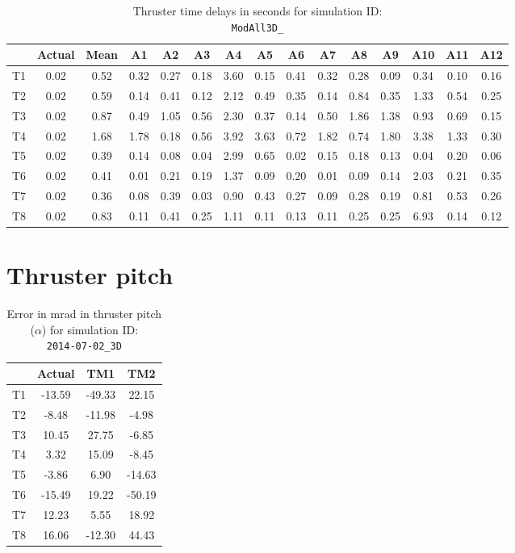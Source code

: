 \begin{table}[H]
\centering
\cprotect\caption{Thruster time delays in seconds for simulation ID:\\
\verb|ModAll3D_|}
\begin{tabular}{|c|c|c|c|c|c|c|c|c|c|c|c|c|c|c|} \hline
~ & Actual & Mean & A1 & A2 & A3 & A4 & A5 & A6 & A7 & A8 & A9 & A10 & A11 & A12 \\ \hline
T1 & 0.02 & 0.52 & 0.32 & 0.27 & 0.18 & 3.60 & 0.15 & 0.41 & 0.32 & 0.28 & 0.09 & 0.34 & 0.10 & 0.16 \\
T2 & 0.02 & 0.59 & 0.14 & 0.41 & 0.12 & 2.12 & 0.49 & 0.35 & 0.14 & 0.84 & 0.35 & 1.33 & 0.54 & 0.25 \\
T3 & 0.02 & 0.87 & 0.49 & 1.05 & 0.56 & 2.30 & 0.37 & 0.14 & 0.50 & 1.86 & 1.38 & 0.93 & 0.69 & 0.15 \\
T4 & 0.02 & 1.68 & 1.78 & 0.18 & 0.56 & 3.92 & 3.63 & 0.72 & 1.82 & 0.74 & 1.80 & 3.38 & 1.33 & 0.30 \\
T5 & 0.02 & 0.39 & 0.14 & 0.08 & 0.04 & 2.99 & 0.65 & 0.02 & 0.15 & 0.18 & 0.13 & 0.04 & 0.20 & 0.06 \\
T6 & 0.02 & 0.41 & 0.01 & 0.21 & 0.19 & 1.37 & 0.09 & 0.20 & 0.01 & 0.09 & 0.14 & 2.03 & 0.21 & 0.35 \\
T7 & 0.02 & 0.36 & 0.08 & 0.39 & 0.03 & 0.90 & 0.43 & 0.27 & 0.09 & 0.28 & 0.19 & 0.81 & 0.53 & 0.26 \\
T8 & 0.02 & 0.83 & 0.11 & 0.41 & 0.25 & 1.11 & 0.11 & 0.13 & 0.11 & 0.25 & 0.25 & 6.93 & 0.14 & 0.12 \\ \hline
\end{tabular}
\label{delay-7}
\end{table}
\newpage
\section*{Thruster pitch}


\begin{table}[H]
\centering
\cprotect\caption{Error in mrad in thruster pitch ($\alpha$) for simulation ID:\\
\verb|2014-07-02_3D|}
\begin{tabular}{|c|c|c|c|} \hline
~ & Actual & TM1 & TM2 \\ \hline
T1 & -13.59 & -49.33 & 22.15 \\
T2 & -8.48 & -11.98 & -4.98 \\
T3 & 10.45 & 27.75 & -6.85 \\
T4 & 3.32 & 15.09 & -8.45 \\
T5 & -3.86 & 6.90 & -14.63 \\
T6 & -15.49 & 19.22 & -50.19 \\
T7 & 12.23 & 5.55 & 18.92 \\
T8 & 16.06 & -12.30 & 44.43 \\ \hline
\end{tabular}
\label{alpha-5}
\end{table}

